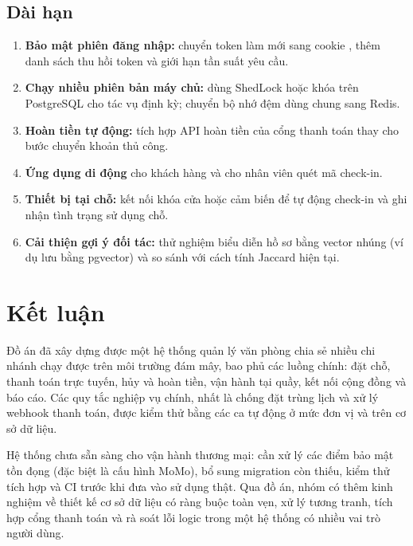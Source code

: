 \subsection{Dài hạn}
\begin{enumerate}
    \item \textbf{Bảo mật phiên đăng nhập:} chuyển token làm mới sang cookie , thêm danh sách thu hồi token và giới hạn tần suất yêu cầu.
    \item \textbf{Chạy nhiều phiên bản máy chủ:} dùng ShedLock hoặc khóa trên PostgreSQL cho tác vụ định kỳ; chuyển bộ nhớ đệm dùng chung sang Redis.
    \item \textbf{Hoàn tiền tự động:} tích hợp API hoàn tiền của cổng thanh toán thay cho bước chuyển khoản thủ công.
    \item \textbf{Ứng dụng di động} cho khách hàng và cho nhân viên quét mã check-in.
    \item \textbf{Thiết bị tại chỗ:} kết nối khóa cửa hoặc cảm biến để tự động check-in và ghi nhận tình trạng sử dụng chỗ.
    \item \textbf{Cải thiện gợi ý đối tác:} thử nghiệm biểu diễn hồ sơ bằng vector nhúng (ví dụ lưu bằng pgvector) và so sánh với cách tính Jaccard hiện tại.
\end{enumerate}

\section{Kết luận}
\label{sec:tk-ket-luan}

Đồ án đã xây dựng được một hệ thống quản lý văn phòng chia sẻ nhiều chi nhánh chạy được trên môi trường đám mây, bao phủ các luồng chính: đặt chỗ, thanh toán trực tuyến, hủy và hoàn tiền, vận hành tại quầy, kết nối cộng đồng và báo cáo. Các quy tắc nghiệp vụ chính, nhất là chống đặt trùng lịch và xử lý webhook thanh toán, được kiểm thử bằng các ca tự động ở mức đơn vị và trên cơ sở dữ liệu.

Hệ thống chưa sẵn sàng cho vận hành thương mại: cần xử lý các điểm bảo mật tồn đọng (đặc biệt là cấu hình MoMo), bổ sung migration còn thiếu, kiểm thử tích hợp và CI trước khi đưa vào sử dụng thật. Qua đồ án, nhóm có thêm kinh nghiệm về thiết kế cơ sở dữ liệu có ràng buộc toàn vẹn, xử lý tương tranh, tích hợp cổng thanh toán và rà soát lỗi logic trong một hệ thống có nhiều vai trò người dùng.

